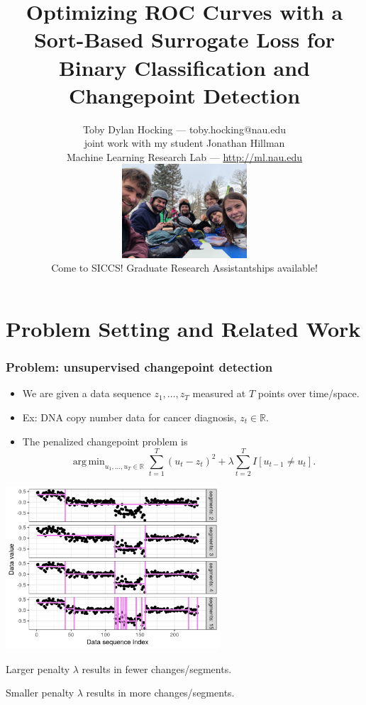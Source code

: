 \documentclass{beamer}
\DeclareMathOperator*{\argmin}{arg\,min}
\begin{document}
\title{Optimizing ROC Curves with a Sort-Based Surrogate Loss for Binary Classification and Changepoint Detection}

\author{
  Toby Dylan Hocking --- toby.hocking@nau.edu\\ 
  joint work with my student Jonathan Hillman\\
  Machine Learning Research Lab --- \url{http://ml.nau.edu}\\
  \includegraphics[height=3.5cm]{2021-03-lab-ski-lunch} \\
  Come to SICCS! Graduate Research Assistantships available!
}

\date{}

\maketitle 

\section{Problem Setting and Related Work}

\begin{frame}
  \frametitle{Problem: unsupervised changepoint detection}
  \begin{itemize}
  \item We are given a data sequence $z_1,\dots,z_T$ measured at $T$
    points over time/space.
  \item Ex: DNA copy number data for cancer diagnosis, $z_t\in\mathbb R$.
  \item The penalized changepoint problem is
$$\argmin_{u_1,\dots,u_T\in\mathbb R} \sum_{t=1}^T (u_t - z_t)^2 + \lambda\sum_{t=2}^T I[u_{t-1} \neq u_t].$$
  \end{itemize}

  \parbox{0.6\textwidth}{
\includegraphics[width=0.6\textwidth]{figure-fn-not-monotonic-no-labels}
}
\parbox{0.3\textwidth}{
  Larger penalty $\lambda$ results in fewer changes/segments.

  \vskip 0.5in

  Smaller penalty $\lambda$ results in more changes/segments.
}

\end{frame}
\end{document}
